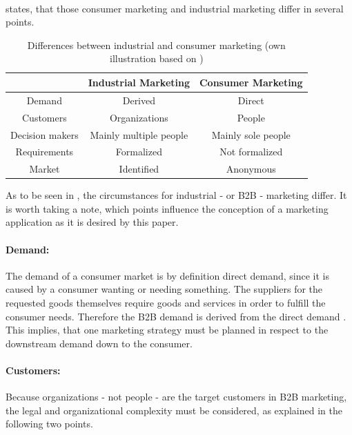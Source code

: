 \paragraph*{} \textcite[20-21]{Backhaus.2015b} states, that those consumer marketing and industrial marketing differ in several points.
\begin{table}[H]
\begin{center}
\begin{tabular}{|c|c|c|}
\hline 
 & Industrial Marketing & Consumer Marketing \\ 
\hline 
Demand & Derived & Direct \\ 
\hline 
Customers & Organizations & People \\ 
\hline 
Decision makers & Mainly multiple people & Mainly sole people \\ 
\hline 
Requirements & Formalized & Not formalized \\ 
\hline 
Market & Identified & Anonymous \\ 
\hline 
\end{tabular} 
\end{center}
\caption[Differences between industrial and consumer marketing]{Differences between industrial and consumer marketing (own illustration based on \protect\cite[21]{Backhaus.2015b})}
\label{tab:marketingdiff}
\end{table}
As to be seen in , the circumstances for industrial - or B2B - marketing differ. It is worth taking a note, which points influence the conception of a marketing application as it is desired by this paper. 
\paragraph*{Demand:} The demand of a consumer market is by definition direct demand, since it is caused by a consumer wanting or needing something. The suppliers for the requested goods themselves require goods and services in order to fulfill the consumer needs. Therefore the B2B demand is derived from the direct demand \parencite[cf.][21]{Backhaus.2015b}. This implies, that one marketing strategy must be planned in respect to the downstream demand down to the consumer. 
\paragraph*{Customers:} Because organizations - not people - are the target customers in B2B marketing, the legal and organizational complexity must be considered, as explained in the following two points.
